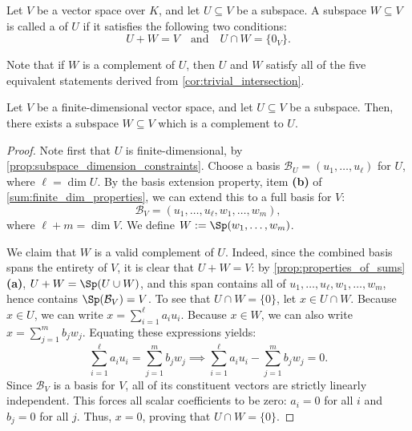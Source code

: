 \begin{definition}
\label{def:complement}
Let $V$ be a vector space over $K$, and let $U \subseteq V$ be a subspace. A subspace $W \subseteq V$ is called a  of $U$ if it satisfies the following two conditions:
\[
U + W = V \quad \text{and} \quad U \cap W = \{0_V\}.
\]
\end{definition}

\begin{remark}
Note that if $W$ is a complement of $U$, then $U$ and $W$ satisfy all of the five equivalent statements derived from \cref{cor:trivial_intersection}.
\end{remark}

\begin{proposition}
\label{prop:existence_complement}
Let $V$ be a finite-di\-men\-sional vector space, and let $U \subseteq V$ be a subspace. Then, there exists a subspace $W \subseteq V$ which is a complement to $U$.
\end{proposition}

\begin{proof}
Note first that $U$ is finite-di\-men\-sional, by \cref{prop:subspace_dimension_constraints}. Choose a basis $\mathcal{B}_U = (u_1, \dots, u_{\ell})$ for $U$, where $\ell = \dim U$. By the basis extension property, item \textbf{(b)} of \cref{sum:finite_dim_properties}, we can extend this to a full basis for $V$:
\[
\mathcal{B}_V = (u_1, \dots, u_{\ell}, w_1, \dots, w_m),
\]
where $\ell + m = \dim V$. We define $W := \Sp(w_1, \dots, w_m)$. 

We claim that $W$ is a valid complement of $U$. Indeed, since the combined basis spans the entirety of $V$, it is clear that $U + W = V$: by \cref{prop:properties_of_sums} \textbf{(a)}, $U + W = \Sp(U \cup W)$, and this span contains all of $u_1, \dots, u_{\ell}, w_1, \dots, w_m$, hence contains $\Sp(\mathcal{B}_V) = V$. To see that $U \cap W = \{0\}$, let $x \in U \cap W$. Because $x \in U$, we can write $x = \sum_{i=1}^{\ell} a_i u_i$. Because $x \in W$, we can also write $x = \sum_{j=1}^m b_j w_j$. Equating these expressions yields:
\[
\sum_{i=1}^{\ell} a_i u_i = \sum_{j=1}^m b_j w_j \implies \sum_{i=1}^{\ell} a_i u_i - \sum_{j=1}^m b_j w_j = 0.
\]
Since $\mathcal{B}_V$ is a basis for $V$, all of its constituent vectors are strictly linearly independent. This forces all scalar coefficients to be zero: $a_i = 0$ for all $i$ and $b_j = 0$ for all $j$. Thus, $x = 0$, proving that $U \cap W = \{0\}$.
\end{proof}

